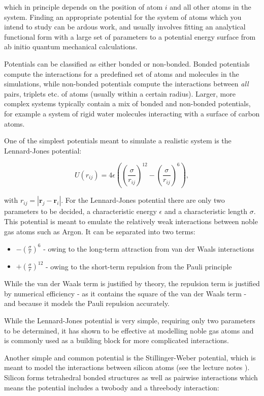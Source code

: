 which in principle depends on the position of atom $i$
and all other atoms in the system. Finding an appropriate potential
for the system of atoms which you intend to study can be ardous work,
and usually involves fitting an analytical functional form
with a large set of parameters to a potential energy surface
from ab initio quantum mechanical calculations.
\par
Potentials can be classified as either bonded or non-bonded.
Bonded potentials compute the interactions for a predefined
set of atoms and molecules in the simulations, while
non-bonded potentials compute the interactions
between \textit{all} pairs, triplets etc. of atoms
(usually within a certain radius).
Larger, more complex systems typically contain a mix of
bonded and non-bonded potentials, for example a system of rigid water molecules
interacting with a surface of carbon atoms.
\par
One of the simplest potentials meant to simulate a realistic system
is the Lennard-Jones potential:

\begin{equation}
 U(r_{ij}) = 4\epsilon \left(\left(\frac{\sigma}{r_{ij}}\right)^{12}
    - \left(\frac{\sigma}{r_{ij}}\right)^{6}\right) , 
\end{equation}

with $r_{ij} = \left| \bm{r}_j - \bm{r}_i \right|$.
For the Lennard-Jones potential there are only two parameters to be decided,
a characteristic energy $\epsilon$ and a characteristic length $\sigma$.
This potential is meant to emulate the relatively weak interactions
between noble gas atoms such as Argon.
It can be separated into two terms:

\begin{itemize}
    \item $\mathrel{-} \left(\frac{\sigma}{r}\right)^6$ - owing to the long-term
        attraction from van der Waals interactions
    \item $\mathrel{+} \left(\frac{\sigma}{r}\right)^{12}$ - owing to the short-term repulsion
        from the Pauli principle
\end{itemize}

While the van der Waals term is justified by theory, the repulsion term
is justified by numerical efficiency - as it contains the square of the van der Waals
term - and because it models the Pauli repulsion accurately.
\par
While the Lennard-Jones potential is very simple, requiring only two parameters
to be determined, it has shown to be effective at modelling noble gas atoms
and is commonly used as a building block for more complicated interactions.
\par
Another simple and common potential is the Stillinger-Weber potential,
which is meant to model the interactions between silicon atoms
(see the lecture notes \parencite[Abrams, Cameron]{che8002013}).
Silicon forms tetrahedral bonded structures as well as pairwise interactions
which means the potential includes a twobody and a threebody interaction:

